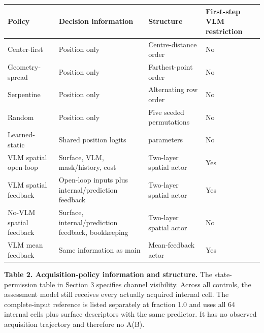 { %
\begin{center}\begin{minipage}{\linewidth}\small
\begin{tabular}{@{}
  >{\raggedright\arraybackslash}p{}
  >{\raggedright\arraybackslash}p{}
  >{\raggedright\arraybackslash}p{}
  >{\raggedright\arraybackslash}p{}@{}}
\toprule\noalign{}
\begin{minipage}[b]{\linewidth}\raggedright
Policy
\end{minipage} & \begin{minipage}[b]{\linewidth}\raggedright
Decision information
\end{minipage} & \begin{minipage}[b]{\linewidth}\raggedright
Structure
\end{minipage} & \begin{minipage}[b]{\linewidth}\raggedright
First-step VLM restriction
\end{minipage} \\
\midrule\noalign{}



Center-first & Position only & Centre-distance order & No \\
Geometry-spread & Position only & Farthest-point order & No \\
Serpentine & Position only & Alternating row order & No \\
Random & Position only & Five seeded permutations & No \\
Learned-static & Shared position logits & 64 parameters & No \\
VLM spatial open-loop & Surface, VLM, mask/history, cost & Two-layer spatial actor & Yes \\
VLM spatial feedback & Open-loop inputs plus internal/prediction feedback & Two-layer spatial actor & Yes \\
No-VLM spatial feedback & Surface, internal/prediction feedback, bookkeeping & Two-layer spatial actor & No \\
VLM mean feedback & Same information as main & Mean-feedback actor & Yes \\
\bottomrule\end{tabular}
\end{minipage}\end{center}
}

\textbf{Table 2. Acquisition-policy information and structure.} The state-permission table in Section 3 specifies channel visibility. Across all controls, the assessment model still receives every actually acquired internal cell. The complete-input reference is listed separately at fraction 1.0 and uses all 64 internal cells plus surface descriptors with the same predictor. It has no observed acquisition trajectory and therefore no A(B).

